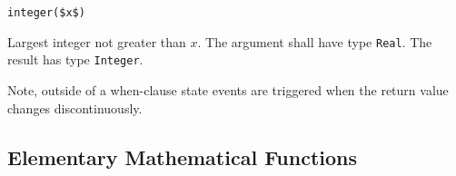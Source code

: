 \begin{operatordefinition}[integer]
\begin{synopsis}\begin{lstlisting}
integer($x$)
\end{lstlisting}\end{synopsis}
\begin{semantics}
Largest integer not greater than $x$.  The argument shall have type \lstinline!Real!.  The result has type \lstinline!Integer!.
\begin{nonnormative}
Note, outside of a when-clause state events are triggered when the return value changes discontinuously.
\end{nonnormative}
\end{semantics}
\end{operatordefinition}

\subsection{Elementary Mathematical Functions}\label{built-in-mathematical-functions-and-external-built-in-functions}

